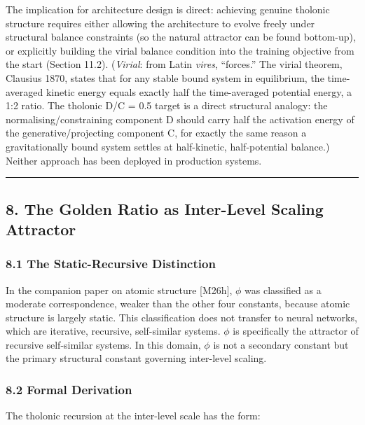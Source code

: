 \documentclass[
  11pt,
  letterpaper,
]{article}
\begin{document}
The implication for architecture design is direct: achieving genuine
tholonic structure requires either allowing the architecture to evolve
freely under structural balance constraints (so the natural attractor
can be found bottom-up), or explicitly building the virial balance
condition into the training objective from the start (Section 11.2).
(\emph{Virial}: from Latin \emph{vires}, ``forces.'' The virial theorem,
Clausius 1870, states that for any stable bound system in equilibrium,
the time-averaged kinetic energy equals exactly half the time-averaged
potential energy, a 1:2 ratio. The tholonic D/C = 0.5 target is a direct
structural analogy: the normalising/constraining component D should
carry half the activation energy of the generative/projecting component
C, for exactly the same reason a gravitationally bound system settles at
half-kinetic, half-potential balance.) Neither approach has been
deployed in production systems.

\begin{center}\rule{0.5\linewidth}{0.5pt}\end{center}

\subsection{8. The Golden Ratio as Inter-Level Scaling
Attractor}\label{the-golden-ratio-as-inter-level-scaling-attractor}

\subsubsection{8.1 The Static-Recursive
Distinction}\label{the-static-recursive-distinction}

In the companion paper on atomic structure {[}M26h{]}, \(\phi\) was
classified as a moderate correspondence, weaker than the other four
constants, because atomic structure is largely static. This
classification does not transfer to neural networks, which are
iterative, recursive, self-similar systems. \(\phi\) is specifically the
attractor of recursive self-similar systems. In this domain, \(\phi\) is
not a secondary constant but the primary structural constant governing
inter-level scaling.

\subsubsection{8.2 Formal Derivation}\label{formal-derivation}

The tholonic recursion at the inter-level scale has the form:
\end{document}
